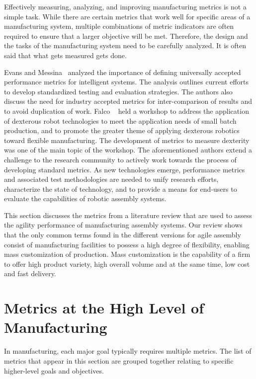 

\label{chapter:KOOTBALLY}

Effectively measuring, analyzing, and improving manufacturing metrics is not a simple task. While there are certain metrics that work well for specific areas of a manufacturing system, multiple combinations of metric indicators are often required to ensure that a larger objective will be met. Therefore, the design and the tasks of the manufacturing system need to be carefully analyzed. It is often said that what gets measured gets done.

Evans and Messina~\cite{Evans.2001} analyzed the importance of defining universally accepted performance metrics for intelligent systems. The analysis outlines current efforts to develop standardized testing and evaluation strategies. The authors also discuss the need for industry accepted metrics for inter-comparison of results and to avoid duplication of work.  Falco \etal~\cite{Falco.NISTIR.2013} held a workshop to address the application of dexterous robot technologies to meet the application needs of small batch production, and to promote the greater theme of applying dexterous robotics toward flexible manufacturing. The development of metrics to measure dexterity was one of the main topic of the workshop. The aforementioned authors extend a challenge to the research community to actively work towards the process of developing standard metrics. As new technologies emerge, performance metrics and associated test methodologies are needed to unify research efforts, characterize the state of technology, and to provide a means for end-users to evaluate the capabilities of robotic assembly systems.

This section discusses the metrics from a literature review that are used to assess the agility performance of manufacturing assembly systems. Our review shows that the only common terms found in the different versions for agile assembly consist of manufacturing facilities to possess a high degree of flexibility, enabling mass customization of production. Mass customization is the capability of a firm to offer high product variety, high overall volume and at the same time, low cost and fast delivery.

\section{Metrics at the High Level of Manufacturing}
In manufacturing, each major goal typically requires multiple metrics. The list of metrics that appear in this section are grouped together relating to specific higher-level goals and objectives.
